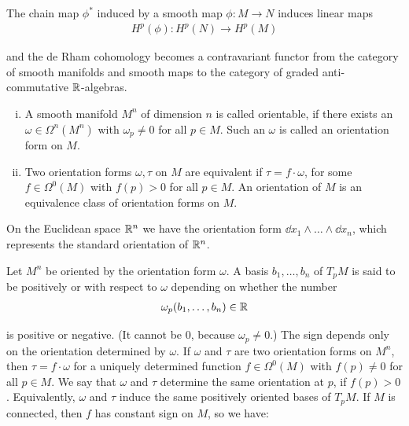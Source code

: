 The chain map $\phi^*$ induced by a smooth map $\phi:M\to N$ induces linear maps 
\begin{align*}
  H^p(\phi):H^p(N)\to H^p(M)
\end{align*}

and the de Rham cohomology becomes a contravariant functor from the category
of smooth manifolds and smooth maps to the category of graded anti-commutative
${\mathbb{R}}$-algebras.


\begin{definition}\label{definition:9-8}
  \begin{enumerate}[(i)]
    \item A smooth manifold $M^n$ of dimension $n$ is called orientable, if there exists
      an $\omega\in\Omega^n(M^n)$ with $\omega_p \neq 0$ for all $p\in M$. Such an $\omega$ is
      called an orientation form on $M$.
    \item Two orientation forms $\omega, \tau$ on $M$ are equivalent if $\tau=f\cdot \omega$, for 
      some $f\in\Omega^0(M)$ with $f(p) > 0$ for all $p\in M$. An orientation of $M$ is an
      equivalence class of orientation forms on $M$.
  \end{enumerate}
\end{definition}

On the Euclidean space ${\mathbb{R}}^n$ we have the orientation form $\dd x_1\wedge\ldots\wedge\dd x_n$, which
represents the standard orientation of ${\mathbb{R}}^n$.

Let $M^n$ be oriented by the orientation form $\omega$. A basis $b_1, \ldots, b_n$ of $T_pM$ is said
to be positively or  with respect to $\omega$ depending on whether
the number
\begin{align*}
  \omega_p(b_1 ,\ldots, b_n) \in {\ensuremath{\mathbb{R}}}
\end{align*}

is positive or negative. (It cannot be 0, because $\omega_p\neq 0$.) The sign depends only
on the orientation determined by $\omega$. If $\omega$ and $\tau$ are two orientation forms on $M^n$,
then $\tau=f\cdot\omega$ for a uniquely determined function $f\in\Omega^0(M)$ with $f(p)\neq 0$ for
all $p\in M$. We say that $\omega$ and $\tau$ determine the same orientation at $p$, if $f(p) > 0$.
Equivalently, $\omega$ and $\tau$ induce the same positively oriented bases of $T_pM$. If $M$
is connected, then $f$ has constant sign on $M$, so we have:

